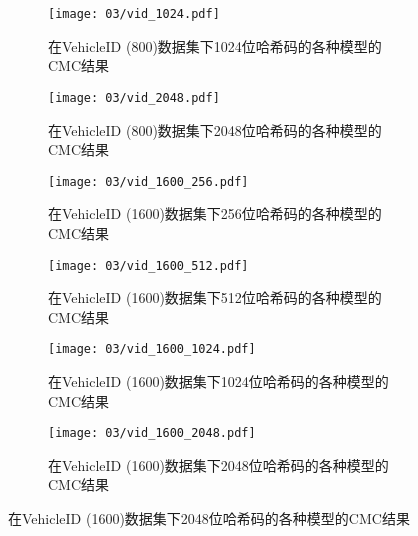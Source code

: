 \begin{figure}[!htp]\ContinuedFloat
  \begin{subfigure}{0.45\textwidth}
    \centering
    \texttt{[image: 03/vid\_1024.pdf]}
    \caption{在VehicleID (800)数据集下1024位哈希码的各种模型的CMC结果}
  \end{subfigure}
  \hspace{1cm}
  \begin{subfigure}{0.45\textwidth}
    \centering
    \texttt{[image: 03/vid\_2048.pdf]}
    \caption{在VehicleID (800)数据集下2048位哈希码的各种模型的CMC结果}
  \end{subfigure}
  \begin{subfigure}{0.45\textwidth}
    \centering
    \texttt{[image: 03/vid\_1600\_256.pdf]}
    \caption{在VehicleID (1600)数据集下256位哈希码的各种模型的CMC结果}
  \end{subfigure}
  \hspace{1cm}
  \begin{subfigure}{0.45\textwidth}
    \centering
    \texttt{[image: 03/vid\_1600\_512.pdf]}
    \caption{在VehicleID (1600)数据集下512位哈希码的各种模型的CMC结果}
  \end{subfigure}
  \begin{subfigure}{0.45\textwidth}
    \centering
    \texttt{[image: 03/vid\_1600\_1024.pdf]}
    \caption{在VehicleID (1600)数据集下1024位哈希码的各种模型的CMC结果}
  \end{subfigure}
  \hspace{1cm}
  \begin{subfigure}{0.45\textwidth}
    \centering
    \texttt{[image: 03/vid\_1600\_2048.pdf]}
    \caption{在VehicleID (1600)数据集下2048位哈希码的各种模型的CMC结果}
  \end{subfigure}
 
  \label{fig:vehashresults}
\end{figure}





